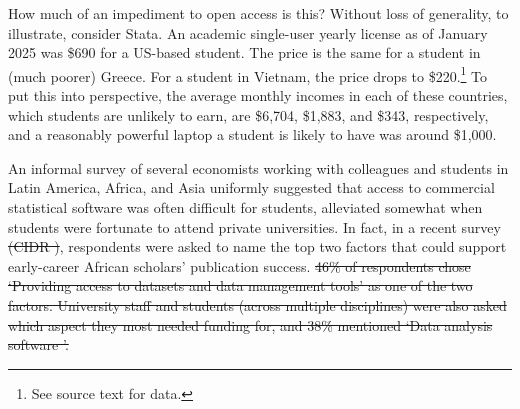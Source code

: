 \documentclass{article}
\providecommand{\DIFadd}[1]{{\protect\color{blue}\uwave{#1}}} %
\providecommand{\DIFdel}[1]{{\protect\color{red}\sout{#1}}} %
\providecommand{\DIFaddbegin}{} %
\providecommand{\DIFaddend}{} %
\providecommand{\DIFdelbegin}{} %
\providecommand{\DIFdelend}{} %
\begin{document}
How much of an impediment to open access is this? Without loss of generality, to illustrate, consider Stata. An academic single-user yearly license as of January 2025 was \$690 for a US-based student. The price is the same for a student in (much poorer) Greece. For a student in Vietnam, the price drops to \$220.\footnote{See source text for data.}  To put this into perspective, the average monthly incomes in each of these countries, which students are unlikely to earn, are \$6,704, \$1,883, and \$343, respectively, and a reasonably powerful laptop a student is likely to have was around \$1,000. 




An informal survey of several economists working with colleagues and students in Latin America, Africa, and Asia uniformly suggested that access to commercial statistical software was often difficult for students, alleviated somewhat when students were fortunate to attend private universities. In fact, in a recent survey \DIFdelbegin \DIFdel{(CIDR )}\DIFdelend \DIFaddbegin \DIFadd{conducted by CIDR \mbox{%
\citep{shipow-cidr}}\hskip0pt%
}\DIFaddend , respondents were asked to name the top two factors that could support early-career African scholars’ publication success. 
\DIFdelbegin \DIFdel{46\% of respondents chose 
`Providing access to datasets and data management tools' as one of the two factors. University staff and students (across multiple disciplines) were also asked which aspect they  most needed funding for, and 38\% mentioned `Data analysis software '.}\DIFdelend %
\end{document}
